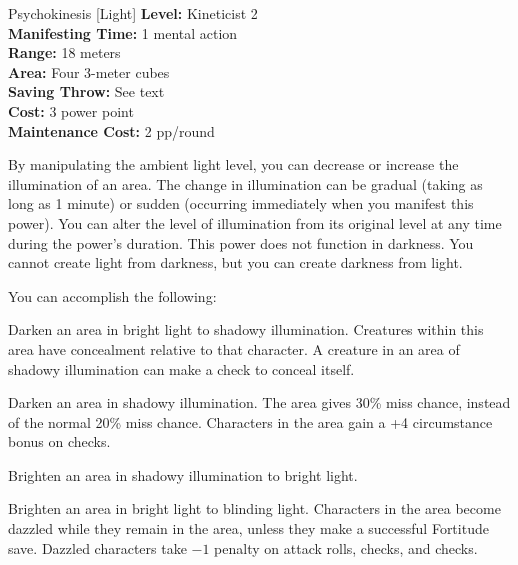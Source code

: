 {Psychokinesis [Light]}
{
	\textbf{Level:}
	Kineticist 2\\
	\textbf{Manifesting Time:}
	1 mental action\\
	\textbf{Range:}
	18 meters\\
	\textbf{Area:}
	Four 3-meter cubes\\
	\textbf{Saving Throw:}
	See text\\
	\textbf{Cost:}
	3 power point\\
	\textbf{Maintenance Cost:}
	2 pp/round\\
}
{
	By manipulating the ambient light level, you can decrease or increase the illumination of an area. The change in illumination can be gradual (taking as long as 1 minute) or sudden (occurring immediately when you manifest this power). You can alter the level of illumination from its original level at any time during the power's duration. This power does not function in darkness. You cannot create light from darkness, but you can create darkness from light.

	You can accomplish the following:
	\begin{itemize*}
	\item Darken an area in bright light to shadowy illumination. Creatures within this area have concealment relative to that character. A creature in an area of shadowy illumination can make a  check to conceal itself.
	\item Darken an area in shadowy illumination. The area gives 30\% miss chance, instead of the normal 20\% miss chance. Characters in the area gain a +4 circumstance bonus on  checks.
	\item Brighten an area in shadowy illumination to bright light.
	\item Brighten an area in bright light to blinding light. Characters in the area become dazzled while they remain in the area, unless they make a successful Fortitude save. Dazzled characters take $-1$ penalty on attack rolls,  checks, and  checks.
	\end{itemize*}
}
